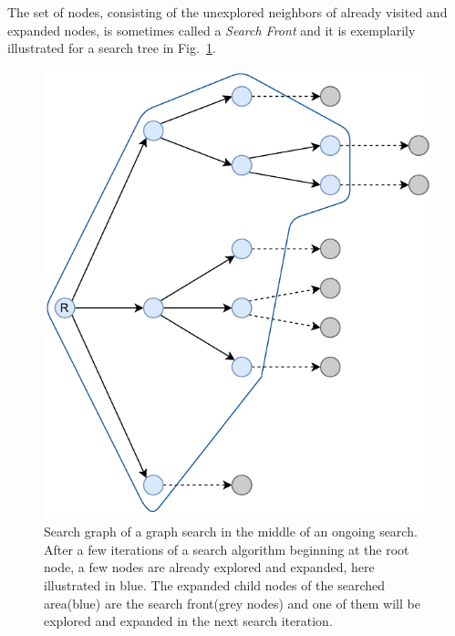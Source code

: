 The set of nodes, consisting of the unexplored neighbors of already visited and expanded nodes, is sometimes called a \textit{Search Front} and it is exemplarily illustrated for a search tree in Fig.~\ref{fig:theory:graph-search-front}.
\begin{figure}[ht!]
    \centering
    \includegraphics[width=\textwidth]{gfx/Figures/Theory/GraphSearchFront.pdf}
    \caption[Search graph of a graph search in the middle of an ongoing search.]{Search graph of a graph search in the middle of an ongoing search. After a few iterations of a search algorithm beginning at the root node, a few nodes are already explored and expanded, here illustrated in blue. The expanded child nodes of the searched area(blue) are the search front(grey nodes) and one of them will be explored and expanded in the next search iteration.}
    \label{fig:theory:graph-search-front}
\end{figure}

